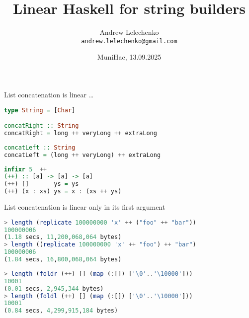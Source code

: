 \documentclass[handout]{beamer}
\title{Linear Haskell for string builders}
\author[Andrew Lelechenko]{Andrew Lelechenko \\ \texttt{andrew.lelechenko@gmail.com}}
\date{MuniHac, 13.09.2025}
\begin{document}
\begin{frame}
  \titlepage

\end{frame}

\begin{frame}[fragile]{List concatenation is linear \dots}

\begin{lstlisting}[language=Haskell]
type String = [Char]

concatRight :: String
concatRight = long ++ veryLong ++ extraLong
\end{lstlisting}

\pause

\begin{lstlisting}[language=Haskell]
concatLeft :: String
concatLeft = (long ++ veryLong) ++ extraLong
\end{lstlisting}

\pause

\begin{lstlisting}[language=Haskell]
infixr 5  ++
(++) :: [a] -> [a] -> [a]
(++) []       ys = ys
(++) (x : xs) ys = x : (xs ++ ys)
\end{lstlisting}

\end{frame}

\begin{frame}[fragile]{List concatenation is linear only in its first argument}

\begin{lstlisting}[language=Haskell]
> length (replicate 100000000 'x' ++ ("foo" ++ "bar"))
100000006
(1.18 secs, 11,200,068,064 bytes)
> length ((replicate 100000000 'x' ++ "foo") ++ "bar")
100000006
(1.84 secs, 16,800,068,064 bytes)
\end{lstlisting}

\pause

\begin{lstlisting}[language=Haskell]
> length (foldr (++) [] (map (:[]) ['\0'..'\10000']))
10001
(0.01 secs, 2,945,344 bytes)
> length (foldl (++) [] (map (:[]) ['\0'..'\10000']))
10001
(0.84 secs, 4,299,915,184 bytes)
\end{lstlisting}

\end{frame}
\end{document}
